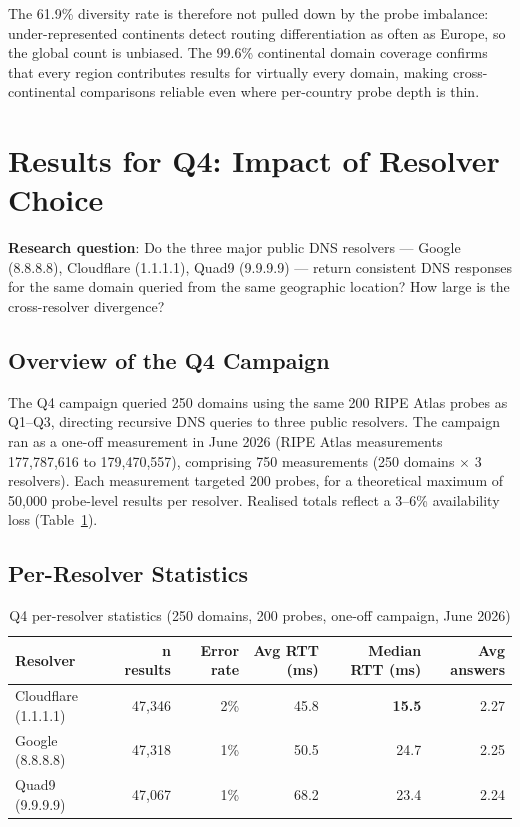 The 61.9\% diversity rate is therefore not pulled down by the probe imbalance: under-represented continents detect routing differentiation as often as Europe, so the global count is unbiased. The 99.6\% continental domain coverage confirms that every region contributes results for virtually every domain, making cross-continental comparisons reliable even where per-country probe depth is thin.

\bigskip
\section{Results for Q4: Impact of Resolver Choice}
\label{sec:4.5}

\textbf{Research question}: Do the three major public \ac{DNS} resolvers --- Google (8.8.8.8), Cloudflare (1.1.1.1), Quad9 (9.9.9.9) --- return consistent \ac{DNS} responses for the same domain queried from the same geographic location? How large is the cross-resolver divergence?

\subsection{Overview of the Q4 Campaign}
\label{subsec:4.5.1}

The Q4 campaign queried 250 domains using the same 200 RIPE Atlas probes as Q1--Q3, directing recursive \ac{DNS} queries to three public resolvers. The campaign ran as a one-off measurement in June 2026 (RIPE Atlas measurements 177,787,616 to 179,470,557), comprising 750 measurements (250 domains $\times$ 3 resolvers). Each measurement targeted 200 probes, for a theoretical maximum of 50,000 probe-level results per resolver. Realised totals reflect a 3--6\% availability loss (Table~\ref{tab:q4_resolver_stats}).

\subsection{Per-Resolver Statistics}
\label{subsec:4.5.2}

\begin{table}[H]
\centering
\small
\begin{tabular}{l r r r r r}
\toprule
\textbf{Resolver} & \textbf{n results} & \textbf{Error rate} & \textbf{Avg RTT (ms)} & \textbf{Median RTT (ms)} & \textbf{Avg answers} \\
\midrule
Cloudflare (1.1.1.1) & 47{,}346 & 2\% & 45.8 & \textbf{15.5} & 2.27 \\
Google (8.8.8.8)     & 47{,}318 & 1\% & 50.5 & 24.7          & 2.25 \\
Quad9 (9.9.9.9)      & 47{,}067 & 1\% & 68.2 & 23.4          & 2.24 \\
\bottomrule
\end{tabular}
\caption{Q4 per-resolver statistics (250 domains, 200 probes, one-off campaign, June 2026)}
\label{tab:q4_resolver_stats}
\end{table}

